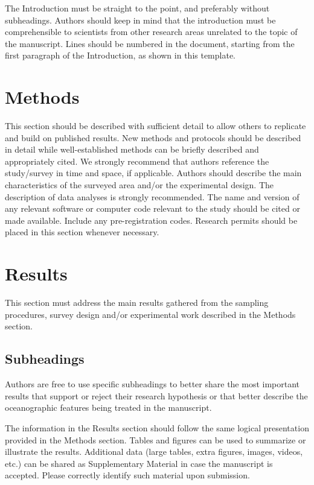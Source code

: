 \documentclass[draft]{OCR}
\begin{document}
The Introduction must be straight to the point, and preferably
without subheadings. Authors should keep in mind that the introduction must be comprehensible to
scientists from other research areas unrelated to the topic of the manuscript.  Lines should be
numbered in the document, starting from the first paragraph of the Introduction, as shown in this
template.

\section{Methods}

This section should be described with sufficient detail to allow others to replicate and build on
published results. New methods and protocols should be described in detail while well-established
methods can be briefly described and appropriately cited. We strongly recommend that authors
reference the study/survey in time and space, if applicable. Authors should describe the main
characteristics of the surveyed area and/or the experimental design. The description of data
analyses is strongly recommended. The name and version of any relevant software or computer code
relevant to the study should be cited or made available. Include any pre-registration
codes. Research permits should be placed in this section whenever necessary.

\section{Results}

This section must address the main results gathered from the sampling procedures, survey design
and/or experimental work described in the Methods section.

\subsection{Subheadings}

Authors are free to use specific subheadings to better share the most important results that support
or reject their research hypothesis or that better describe the oceanographic features being treated
in the manuscript.

The information in the Results section should follow the same logical presentation provided in the
Methods section. Tables and figures can be used to summarize or illustrate the results. Additional
data (large tables, extra figures, images, videos, etc.) can be shared as Supplementary Material in
case the manuscript is accepted. Please correctly identify such material upon submission.
\end{document}
